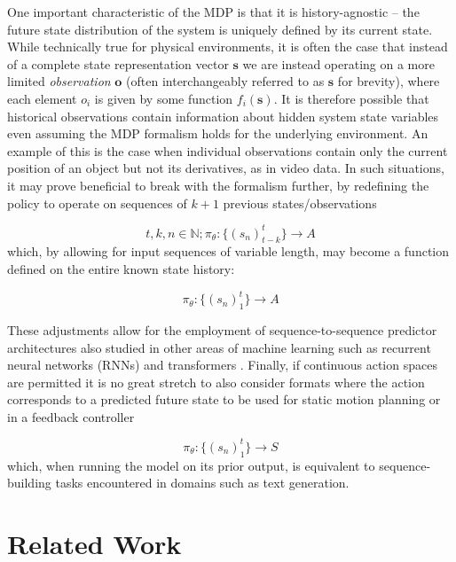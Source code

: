 \documentclass{article}
\begin{document}
One important characteristic of the MDP is that it is history-agnostic -- the future state distribution of the system is uniquely defined by its current state. While technically true for physical environments, it is often the case that instead of a complete state representation vector $\mathbf{s}$ we are instead operating on a more limited \emph{observation} $\mathbf{o}$ (often interchangeably referred to as $\mathbf{s}$ for brevity), where each element $o_i$ is given by some function $f_i(\mathbf{s})$. It is therefore possible that historical observations contain information about hidden system state variables even assuming the MDP formalism holds for the underlying environment. An example of this is the case when individual observations contain only the current position of an object but not its derivatives, as in video data. In such situations, it may prove beneficial to break with the formalism further, by redefining the policy to operate on sequences of $k+1$ previous states/observations

\begin{equation}
	t, k, n \in \mathbb{N}; \pi_{\theta}:\lbrace {(s_n)_{t-k}^t} \rbrace \rightarrow A
\end{equation}
which, by allowing for input sequences of variable length, may become a function defined on the entire known state history:

\begin{equation}
	\pi_{\theta}:\lbrace {(s_n)_1^t} \rbrace \rightarrow A
\end{equation}

These adjustments allow for the employment of sequence-to-sequence predictor architectures also studied in other areas of machine learning such as recurrent neural networks (RNNs) \citep{rumelhart1985learning} and transformers \citep{vaswani2017attention}. Finally, if continuous action spaces are permitted it is no great stretch to also consider formats where the action corresponds to a predicted future state to be used for static motion planning or in a feedback controller

\begin{equation}
	\pi_{\theta}:\lbrace {(s_n)_1^t} \rbrace \rightarrow S
\end{equation}
which, when running the model on its prior output, is equivalent to sequence-building tasks encountered in domains such as text generation. 


\section{Related Work}
\label{sec:related}
\end{document}
